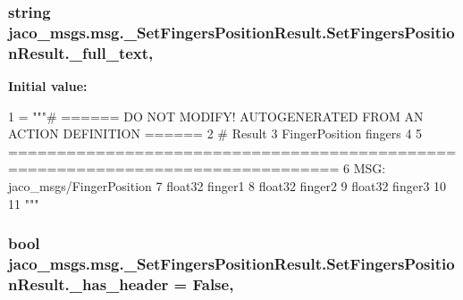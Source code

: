 \subsubsection[{\texorpdfstring{\+\_\+full\+\_\+text}{_full_text}}]{\setlength{\rightskip}{0pt plus 5cm}string jaco\+\_\+msgs.\+msg.\+\_\+\+Set\+Fingers\+Position\+Result.\+Set\+Fingers\+Position\+Result.\+\_\+full\+\_\+text\hspace{0.3cm}{\ttfamily [static]}, {\ttfamily [private]}}\hypertarget{classjaco__msgs_1_1msg_1_1__SetFingersPositionResult_1_1SetFingersPositionResult_a20a964a0a00cb9db82ca39e79b7a1416}{}\label{classjaco__msgs_1_1msg_1_1__SetFingersPositionResult_1_1SetFingersPositionResult_a20a964a0a00cb9db82ca39e79b7a1416}
{\bfseries Initial value\+:}
\begin{DoxyCode}
1 = \textcolor{stringliteral}{"""# ====== DO NOT MODIFY! AUTOGENERATED FROM AN ACTION DEFINITION ======}
2 \textcolor{stringliteral}{# Result}
3 \textcolor{stringliteral}{FingerPosition fingers}
4 \textcolor{stringliteral}{}
5 \textcolor{stringliteral}{================================================================================}
6 \textcolor{stringliteral}{MSG: jaco\_msgs/FingerPosition}
7 \textcolor{stringliteral}{float32 finger1}
8 \textcolor{stringliteral}{float32 finger2}
9 \textcolor{stringliteral}{float32 finger3}
10 \textcolor{stringliteral}{}
11 \textcolor{stringliteral}{"""}
\end{DoxyCode}
\subsubsection[{\texorpdfstring{\+\_\+has\+\_\+header}{_has_header}}]{\setlength{\rightskip}{0pt plus 5cm}bool jaco\+\_\+msgs.\+msg.\+\_\+\+Set\+Fingers\+Position\+Result.\+Set\+Fingers\+Position\+Result.\+\_\+has\+\_\+header = False\hspace{0.3cm}{\ttfamily [static]}, {\ttfamily [private]}}\hypertarget{classjaco__msgs_1_1msg_1_1__SetFingersPositionResult_1_1SetFingersPositionResult_a7439ece6f7c49c269dc5c601eb6b2014}{}\label{classjaco__msgs_1_1msg_1_1__SetFingersPositionResult_1_1SetFingersPositionResult_a7439ece6f7c49c269dc5c601eb6b2014}

